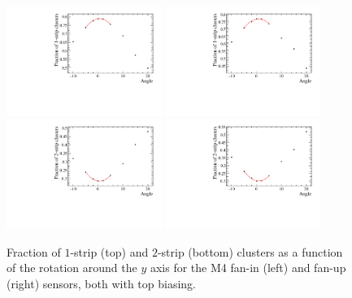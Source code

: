\begin{figure}[]
\centering
\includegraphics[width=0.45\textwidth]{figs/SNRvsAngle/cf1StripClustervsAngle_M4_FanIn_Top.pdf}
\includegraphics[width=0.45\textwidth]{figs/SNRvsAngle/cf1StripClustervsAngle_M4_FanUp_Top.pdf}
\includegraphics[width=0.45\textwidth]{figs/SNRvsAngle/cf2StripClustervsAngle_M4_FanIn_Top.pdf}
\includegraphics[width=0.45\textwidth]{figs/SNRvsAngle/cf2StripClustervsAngle_M4_FanUp_Top.pdf}
\caption[Fraction of $1$-strip and $2$-strip clusters as a function of the rotation around the $y$ axis.]{Fraction of $1$-strip (top) and $2$-strip (bottom) clusters as a function of the rotation around the $y$ axis for the M4 fan-in (left) and fan-up (right) sensors, both with top biasing.}
\label{fig:fStripClustersvsAngle}
\end{figure}